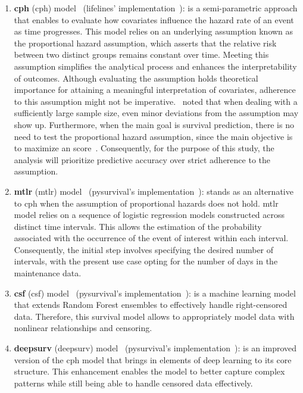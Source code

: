 \begin{enumerate}
\item \textbf{\acl{cph}} (\acs{cph}) model~\cite{Cox1972} (lifelines' implementation~\cite{Lifelines2021}): is a semi-parametric approach that enables to evaluate how covariates influence the hazard rate of an event as time progresses. This model relies on an underlying assumption known as the proportional hazard assumption, which asserts that the relative risk between two distinct groups remains constant over time. Meeting this assumption simplifies the analytical process and enhances the interpretability of outcomes. Although evaluating the assumption holds theoretical importance for attaining a meaningful interpretation of covariates, adherence to this assumption might not be imperative.~\cite{Stensrud2020} noted that when dealing with a sufficiently large sample size, even minor deviations from the assumption may show up. Furthermore, when the main goal is survival prediction, there is no need to test the proportional hazard assumption, since the main objective is to maximize an score~\cite{lifelines_ph_assumption}. Consequently, for the purpose of this study, the analysis will prioritize predictive accuracy over strict adherence to the assumption.

\item \textbf{\acl{mtlr}} (\acs{mtlr}) model~\cite{Yu2021} (pysurvival's implementation~\cite{pysurvival}): stands as an alternative to \ac{cph} when the assumption of proportional hazards does not hold. \ac{mtlr} model relies on a sequence of logistic regression models constructed across distinct time intervals. This allows the estimation of the probability associated with the occurrence of the event of interest within each interval. Consequently, the initial step involves specifying the desired number of intervals, with the present use case opting for the number of days in the maintenance data.

\item \textbf{\acl{csf}} (\acs{csf}) model~\cite{Wright2017} (pysurvival's implementation~\cite{pysurvival}): is a machine learning model that extends Random Forest ensembles to effectively handle right-censored data. Therefore, this survival model allows to appropriately model data with nonlinear relationships and censoring.

\item \textbf{\acl{deepsurv}} (\acs{deepsurv}) model~\cite{Katzman2018} (pysurvival's implementation~\cite{pysurvival}): is an improved version of the \ac{cph} model that brings in elements of deep learning to its core structure. This enhancement enables the model to better capture complex patterns while still being able to handle censored data effectively.
\end{enumerate}

